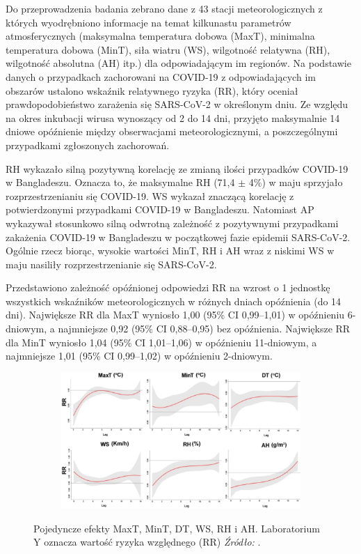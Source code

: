 \documentclass[polish, twoside, 12pt, a4paper]{article}
\theoremstyle{definition}
\theoremstyle{plain}
\theoremstyle{remark}
\begin{document}
Do przeprowadzenia badania zebrano dane z 43 stacji meteorologicznych z których wyodrębniono informacje na temat kilkunastu parametrów atmosferycznych (maksymalna temperatura dobowa (MaxT), minimalna temperatura dobowa (MinT), siła wiatru (WS), wilgotność relatywna (RH), wilgotność absolutna (AH) itp.) dla odpowiadającym im regionów. Na podstawie danych o przypadkach zachorowani na COVID-19 z odpowiadających im obszarów ustalono wskaźnik relatywnego ryzyka (RR), który oceniał prawdopodobieństwo zarażenia się SARS-CoV-2 w określonym dniu. Ze względu na okres inkubacji wirusa wynoszący od 2 do 14 dni, przyjęto maksymalnie 14 dniowe opóźnienie między obserwacjami meteorologicznymi, a poszczególnymi przypadkami zgłoszonych zachorowań.

RH wykazało silną pozytywną korelację ze zmianą ilości przypadków COVID-19 w Bangladeszu. Oznacza to, że maksymalne RH (71,4 $\pm$ 4\%) w maju sprzyjało rozprzestrzenianiu się COVID-19. WS wykazał znaczącą korelację z potwierdzonymi przypadkami COVID-19 w Bangladeszu. Natomiast AP wykazywał stosunkowo silną odwrotną zależność z pozytywnymi przypadkami zakażenia COVID-19 w Bangladeszu w początkowej fazie epidemii SARS-CoV-2. Ogólnie rzecz biorąc, wysokie wartości MinT, RH i AH wraz z niskimi WS w maju nasiliły rozprzestrzenianie się SARS-CoV-2.

Przedstawiono zależność opóźnionej odpowiedzi RR na wzrost o 1 jednostkę wszystkich wskaźników meteorologicznych w różnych dniach opóźnienia (do 14 dni). Największe RR dla MaxT wyniosło 1,00 (95\% CI 0,99--1,01) w opóźnieniu 6-dniowym, a najmniejsze 0,92 (95\% CI 0,88--0,95) bez opóźnienia. Największe RR dla MinT wyniosło 1,04 (95\% CI 1,01--1,06) w opóźnieniu 11-dniowym, a najmniejsze 1,01 (95\% CI 0,99--1,02) w opóźnieniu 2-dniowym. 


\begin{figure}[H]
  \centering
  \begin{subfigure}[t]{\textwidth}
    \includegraphics[width=15cm]{clmate-factors.jpg}
  \end{subfigure}
  \captionsetup{margin=10pt,font=small,labelfont=bf,width=.8\textwidth}
  \caption{Pojedyncze efekty MaxT, MinT, DT, WS, RH i AH. Laboratorium Y oznacza wartość ryzyka względnego (RR) \textit{Źródło:} \cite{hasanuzzaman2020}.}\label{fig:xxx3}
\end{figure}
\end{document}
